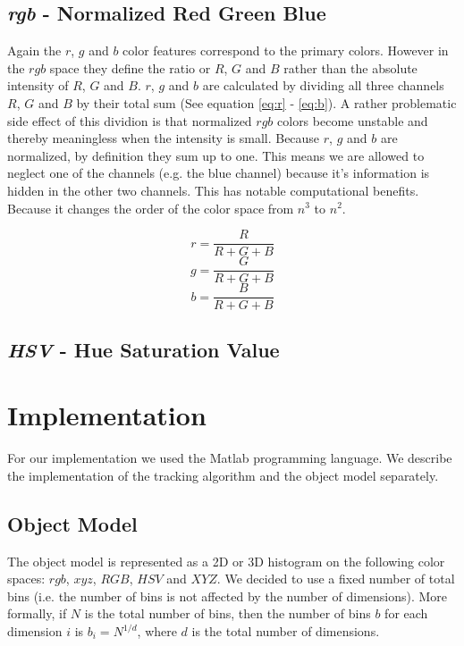 \documentclass[11pt]{article}
\begin{document}
\subsection{\textit{rgb} - Normalized Red Green Blue}
Again the $r$, $g$ and $b$  color features correspond to the primary colors.
However in the $rgb$ space they define the ratio or $R$, $G$ and $B$ rather than
the absolute intensity of $R$, $G$ and $B$. $r$, $g$ and $b$ are calculated by
dividing all three channels $R$, $G$ and $B$ by their total sum (See equation
\ref{eq:r} - \ref{eq:b}). A rather problematic side effect of this dividion is
that normalized $rgb$ colors become unstable and thereby meaningless when the
intensity is small. Because $r$, $g$ and $b$ are normalized, by definition they
sum up to one. This means we are allowed to neglect one of the channels (e.g.
the blue channel) because it's information is hidden in the other two channels.
This has notable computational benefits. Because it changes the order of the
color space from $n^3$ to $n^2$.

\begin{equation}
  r = \frac{R}{R+G+B}
  \label{eq:r}
\end{equation}
\begin{equation}
  g = \frac{G}{R+G+B}
  \label{eq:g}
\end{equation}
\begin{equation}
  b = \frac{B}{R+G+B}
  \label{eq:b}
\end{equation}

\subsection{\textit{HSV} - Hue Saturation Value}

\section{Implementation} \label{sec:implementation}
For our implementation we used the Matlab programming language. We describe the
implementation of the tracking algorithm and the object model separately.

\subsection{Object Model} \label{sec:model}
The object model is represented as a 2D or 3D histogram on the following color
spaces: $rgb$, $xyz$, $RGB$, $HSV$ and $XYZ$. We decided to use a fixed number
of total bins (i.e. the number of bins is not affected by the number of
dimensions).  More formally, if $N$ is the total number of bins, then the number
of bins $b$ for each dimension $i$ is $b_i = N^{1/d}$, where $d$ is the total
number of dimensions. 
\end{document}
